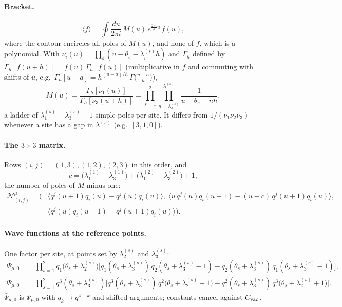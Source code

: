 \documentclass[10pt]{article}
\newcommand{\vac}{{\rm vac}}
\begin{document}
\paragraph{Bracket.}
\begin{equation}
\langle f\rangle=\oint\frac{du}{2\pi i}\,M(u)\,e^{\frac{2\pi i}{h}u}\,f(u),
\end{equation}
where the contour encircles all poles of $M(u)$, and none of $f$, which is a polynomial.
With $\nu_i(u)=\prod_s(u-\theta_s-\lambda^{(s)}_i h)$ and $\Gamma_h$ defined by
$\Gamma_h[f(u+h)]=f(u)\,\Gamma_h[f(u)]$ (multiplicative in $f$ and commuting with shifts of $u$, e.g.\ $\Gamma_h[u-a]=h^{(u-a)/h}\,\Gamma\big(\tfrac{u-a}{h}\big)$),
\begin{equation}
M(u)=\frac{\Gamma_h[\nu_1(u)]}{\Gamma_h[\nu_3(u+h)]}
=\prod_{s=1}^{2}\prod_{n=\lambda^{(s)}_3}^{\lambda^{(s)}_1}\frac{1}{u-\theta_s-nh},
\end{equation}
a ladder of $\lambda^{(s)}_1-\lambda^{(s)}_3+1$ simple poles per site. It differs from $1/(\nu_1\nu_2\nu_3)$ whenever a site has a gap in $\lambda^{(s)}$ (e.g.\ $[3,1,0]$).

\paragraph{The $3\times3$ matrix.} Rows $(i,j)=(1,3),(1,2),(2,3)$ in this order, and
\begin{equation}
c=\big(\lambda^{(1)}_1-\lambda^{(1)}_3\big)+\big(\lambda^{(2)}_1-\lambda^{(2)}_3\big)+1,
\end{equation}
the number of poles of $M$ minus one:
\begin{equation}
\begin{aligned}
\mathcal N^\mu_{(i,j)}=\Big(&
\big\langle q^j(u{+}1)q_i(u)-q^j(u)q_i(u)\big\rangle,\;
\big\langle u\,q^j(u)q_i(u{-}1)-(u-c)\,q^j(u{+}1)q_i(u)\big\rangle,\\
&\big\langle q^j(u)q_i(u{-}1)-q^j(u{+}1)q_i(u)\big\rangle\Big).
\end{aligned}
\end{equation}

\paragraph{Wave functions at the reference points.} One factor per site, at points set by $\lambda^{(s)}_2$ and $\lambda^{(s)}_3$:
\begin{align}
\Psi_{\mu,0}&=\prod_{s=1}^2 q_1\big(\theta_s{+}\lambda^{(s)}_2\big)\big[q_1(\theta_s{+}\lambda^{(s)}_3)\,q_2(\theta_s{+}\lambda^{(s)}_3{-}1)-q_2(\theta_s{+}\lambda^{(s)}_3)\,q_1(\theta_s{+}\lambda^{(s)}_3{-}1)\big],\\
\bar\Psi_{\mu,0}&=\prod_{s=1}^2 q^3(\theta_s{+}\lambda^{(s)}_3)\big[q^3(\theta_s{+}\lambda^{(s)}_3)\,q^2\big(\theta_s{+}\lambda^{(s)}_2{+}1\big)-q^2(\theta_s{+}\lambda^{(s)}_3)\,q^3\big(\theta_s{+}\lambda^{(s)}_2{+}1\big)\big].
\end{align}
$\bar\Psi_{\mu,0}$ is $\Psi_{\mu,0}$ with $q_k\to q^{4-k}$ and shifted arguments; constants cancel against $C_\vac$.
\end{document}
